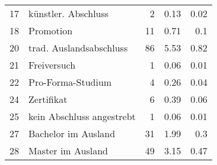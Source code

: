 \begin{longtable}{lXrrr}
        17 & \multicolumn{1}{X}{künstler. Abschluss} & %
          \num{2} &
          \num[round-mode=places,round-precision=2]{0,13} &
          \num[round-mode=places,round-precision=2]{0,02} \\

        18 & \multicolumn{1}{X}{Promotion} & %
          \num{11} &
          \num[round-mode=places,round-precision=2]{0,71} &
          \num[round-mode=places,round-precision=2]{0,1} \\

        20 & \multicolumn{1}{X}{trad. Auslandsabschluss} & %
          \num{86} &
          \num[round-mode=places,round-precision=2]{5,53} &
          \num[round-mode=places,round-precision=2]{0,82} \\

        21 & \multicolumn{1}{X}{Freiversuch} & %
          \num{1} &
          \num[round-mode=places,round-precision=2]{0,06} &
          \num[round-mode=places,round-precision=2]{0,01} \\

        22 & \multicolumn{1}{X}{Pro-Forma-Studium} & %
          \num{4} &
          \num[round-mode=places,round-precision=2]{0,26} &
          \num[round-mode=places,round-precision=2]{0,04} \\

        24 & \multicolumn{1}{X}{Zertifikat} & %
          \num{6} &
          \num[round-mode=places,round-precision=2]{0,39} &
          \num[round-mode=places,round-precision=2]{0,06} \\

        25 & \multicolumn{1}{X}{kein Abschluss angestrebt} & %
          \num{1} &
          \num[round-mode=places,round-precision=2]{0,06} &
          \num[round-mode=places,round-precision=2]{0,01} \\

        27 & \multicolumn{1}{X}{Bachelor im Ausland} & %
          \num{31} &
          \num[round-mode=places,round-precision=2]{1,99} &
          \num[round-mode=places,round-precision=2]{0,3} \\

        28 & \multicolumn{1}{X}{Master im Ausland} & %
          \num{49} &
          \num[round-mode=places,round-precision=2]{3,15} &
          \num[round-mode=places,round-precision=2]{0,47} \\


\end{longtable}
